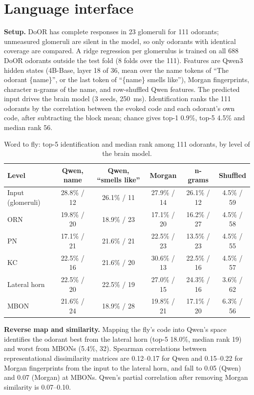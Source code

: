 \section{Language interface}\label{app:language}
\textbf{Setup.} DoOR has complete responses in 23 glomeruli for 111 odorants; unmeasured glomeruli are silent in the model, so only odorants with identical coverage are compared. A ridge regression per glomerulus is trained on all 688 DoOR odorants outside the test fold (8 folds over the 111). Features are Qwen3 hidden states (4B-Base, layer 18 of 36, mean over the name tokens of ``The odorant \{name\}'', or the last token of ``\{name\} smells like''), Morgan fingerprints, character n-grams of the name, and row-shuffled Qwen features. The predicted input drives the brain model (3 seeds, 250~ms). Identification ranks the 111 odorants by the correlation between the evoked code and each odorant's own code, after subtracting the block mean; chance gives top-1 0.9\%, top-5 4.5\% and median rank 56.

\begin{table}[h]
\centering
\caption{Word to fly: top-5 identification and median rank among 111 odorants, by level of the brain model.}
\label{tab:rosetta}
\small
\begin{tabular}{lccccc}
\toprule
Level & Qwen, name & Qwen, ``smells like'' & Morgan & n-grams & Shuffled \\
\midrule
Input (glomeruli) & 28.8\% / 12 & 26.1\% / 11 & 27.9\% / 14 & 26.1\% / 12 & 4.5\% / 59 \\
ORN & 19.8\% / 20 & 18.9\% / 23 & 17.1\% / 20 & 16.2\% / 27 & 4.5\% / 58 \\
PN & 17.1\% / 21 & 21.6\% / 21 & 22.5\% / 23 & 13.5\% / 23 & 4.5\% / 55 \\
KC & 22.5\% / 16 & 21.6\% / 20 & 30.6\% / 13 & 22.5\% / 16 & 4.5\% / 57 \\
Lateral horn & 22.5\% / 20 & 22.5\% / 19 & 27.0\% / 15 & 24.3\% / 16 & 3.6\% / 62 \\
MBON & 21.6\% / 24 & 18.9\% / 28 & 19.8\% / 21 & 17.1\% / 20 & 6.3\% / 56 \\
\bottomrule
\end{tabular}
\end{table}

\textbf{Reverse map and similarity.} Mapping the fly's code into Qwen's space identifies the odorant best from the lateral horn (top-5 18.0\%, median rank 19) and worst from MBONs (5.4\%, 32). Spearman correlations between representational dissimilarity matrices are 0.12--0.17 for Qwen and 0.15--0.22 for Morgan fingerprints from the input to the lateral horn, and fall to 0.05 (Qwen) and 0.07 (Morgan) at MBONs. Qwen's partial correlation after removing Morgan similarity is 0.07--0.10.

